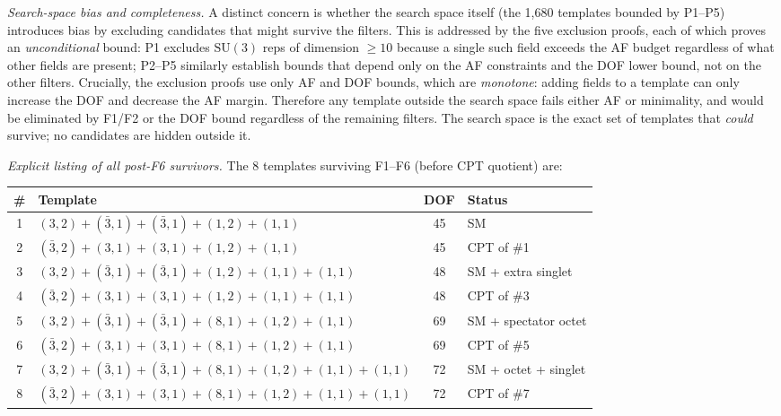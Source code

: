 \documentclass[11pt,a4paper]{article}
\theoremstyle{definition}
\newcommand{\SU}{\mathrm{SU}}
\begin{document}
\smallskip\noindent\textit{Search-space bias and completeness.}\quad
A distinct concern is whether the search space itself (the 1{,}680
templates bounded by P1--P5) introduces bias by excluding candidates
that might survive the filters.  This is addressed by the five
exclusion proofs, each of which proves an \emph{unconditional} bound:
P1 excludes $\SU(3)$ reps of dimension $\ge 10$ because a single
such field exceeds the AF budget regardless of what other fields are
present; P2--P5 similarly establish bounds that depend only on the
AF constraints and the DOF lower bound, not on the other filters.
Crucially, the exclusion proofs use only AF and DOF bounds, which are
\emph{monotone}: adding fields to a template can only increase the
DOF and decrease the AF margin.  Therefore any template outside the
search space fails either AF or minimality, and would be eliminated
by F1/F2 or the DOF bound regardless of the remaining filters.
The search space is the exact set of templates that \emph{could}
survive; no candidates are hidden outside it.

\smallskip\noindent\textit{Explicit listing of all post-F6 survivors.}\quad
The 8 templates surviving F1--F6 (before CPT quotient) are:

\smallskip
\begin{center}\small
\renewcommand{\arraystretch}{1.15}
\begin{tabular}{@{}clcl@{}}
\toprule
\# & Template & DOF & Status \\
\midrule
1 & $(3,2) + (\bar{3},1) + (\bar{3},1) + (1,2) + (1,1)$ & 45 & SM \\
2 & $(\bar{3},2) + (3,1) + (3,1) + (1,2) + (1,1)$ & 45 & CPT of \#1 \\
3 & $(3,2) + (\bar{3},1) + (\bar{3},1) + (1,2) + (1,1) + (1,1)$ & 48 & SM + extra singlet \\
4 & $(\bar{3},2) + (3,1) + (3,1) + (1,2) + (1,1) + (1,1)$ & 48 & CPT of \#3 \\
5 & $(3,2) + (\bar{3},1) + (\bar{3},1) + (8,1) + (1,2) + (1,1)$ & 69 & SM + spectator octet \\
6 & $(\bar{3},2) + (3,1) + (3,1) + (8,1) + (1,2) + (1,1)$ & 69 & CPT of \#5 \\
7 & $(3,2) + (\bar{3},1) + (\bar{3},1) + (8,1) + (1,2) + (1,1) + (1,1)$ & 72 & SM + octet + singlet \\
8 & $(\bar{3},2) + (3,1) + (3,1) + (8,1) + (1,2) + (1,1) + (1,1)$ & 72 & CPT of \#7 \\
\bottomrule
\end{tabular}
\end{center}
\end{document}
